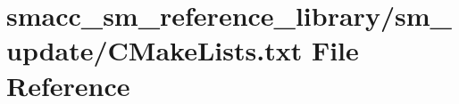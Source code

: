 \hypertarget{sm__reference__library_2sm__update_2CMakeLists_8txt}{}\section{smacc\+\_\+sm\+\_\+reference\+\_\+library/sm\+\_\+update/\+C\+Make\+Lists.txt File Reference}
\label{sm__reference__library_2sm__update_2CMakeLists_8txt}
